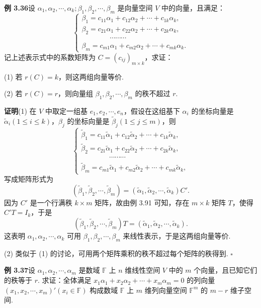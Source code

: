 \documentclass[UTF8,12pt,a4paper,fontset=fandol]{ctexart}
\begin{document}
\noindent\textbf{例 3.36}\quad 设 $\alpha_1,\alpha_2,\cdots,\alpha_k;\beta_1,\beta_2,\cdots,\beta_m$ 是向量空间 $V$ 中的向量，且满足：
\[
\left\{
\begin{array}{l}
\beta_1=c_{11}\alpha_1+c_{12}\alpha_2+\cdots+c_{1k}\alpha_k,\\
\beta_2=c_{21}\alpha_1+c_{22}\alpha_2+\cdots+c_{2k}\alpha_k,\\
\hspace{4em}\cdots\cdots\cdots\\
\beta_m=c_{m1}\alpha_1+c_{m2}\alpha_2+\cdots+c_{mk}\alpha_k.
\end{array}
\right.
\]
记上述表示式中的系数矩阵为 $C=(c_{ij})_{m\times k}$，求证：

(1) 若 $r(C)=k$，则这两组向量等价.

(2) 若 $r(C)=r$，则向量组 $\beta_1,\beta_2,\cdots,\beta_m$ 的秩不超过 $r$.

\noindent\textbf{证明}\quad (1) 在 $V$ 中取定一组基 $e_1,e_2,\cdots,e_n$，假设在这组基下 $\alpha_i$ 的坐标向量是 $\widetilde\alpha_i(1\le i\le k)$，$\beta_j$ 的坐标向量是 $\widetilde\beta_j(1\le j\le m)$，则
\[
\left\{
\begin{array}{l}
\widetilde\beta_1=c_{11}\widetilde\alpha_1+c_{12}\widetilde\alpha_2+\cdots+c_{1k}\widetilde\alpha_k,\\
\widetilde\beta_2=c_{21}\widetilde\alpha_1+c_{22}\widetilde\alpha_2+\cdots+c_{2k}\widetilde\alpha_k,\\
\hspace{4em}\cdots\cdots\cdots\\
\widetilde\beta_m=c_{m1}\widetilde\alpha_1+c_{m2}\widetilde\alpha_2+\cdots+c_{mk}\widetilde\alpha_k,
\end{array}
\right.
\]
写成矩阵形式为
\[
(\widetilde\beta_1,\widetilde\beta_2,\cdots,\widetilde\beta_m)=(\widetilde\alpha_1,\widetilde\alpha_2,\cdots,\widetilde\alpha_k)C'.
\]
因为 $C'$ 是一个行满秩 $k\times m$ 矩阵，故由例 3.91 可知，存在 $m\times k$ 矩阵 $T$，使得 $C'T=I_k$，于是
\[
(\widetilde\beta_1,\widetilde\beta_2,\cdots,\widetilde\beta_m)T=(\widetilde\alpha_1,\widetilde\alpha_2,\cdots,\widetilde\alpha_k).
\]
这表明 $\alpha_1,\alpha_2,\cdots,\alpha_k$ 可用 $\beta_1,\beta_2,\cdots,\beta_m$ 来线性表示，于是这两组向量等价.

(2) 类似于 (1) 的讨论，可用两个矩阵乘积的秩不超过每个矩阵的秩得到. $\square$

\noindent\textbf{例 3.37}\quad 设 $\alpha_1,\alpha_2,\cdots,\alpha_m$ 是数域 $\mathbb{F}$ 上 $n$ 维线性空间 $V$ 中的 $m$ 个向量，且已知它们的秩等于 $r$. 求证：全体满足 $x_1\alpha_1+x_2\alpha_2+\cdots+x_m\alpha_m=0$ 的列向量 $(x_1,x_2,\cdots,x_m)'(x_i\in\mathbb{F})$ 构成数域 $\mathbb{F}$ 上 $m$ 维列向量空间 $\mathbb{F}^m$ 的 $m-r$ 维子空间.
\end{document}
